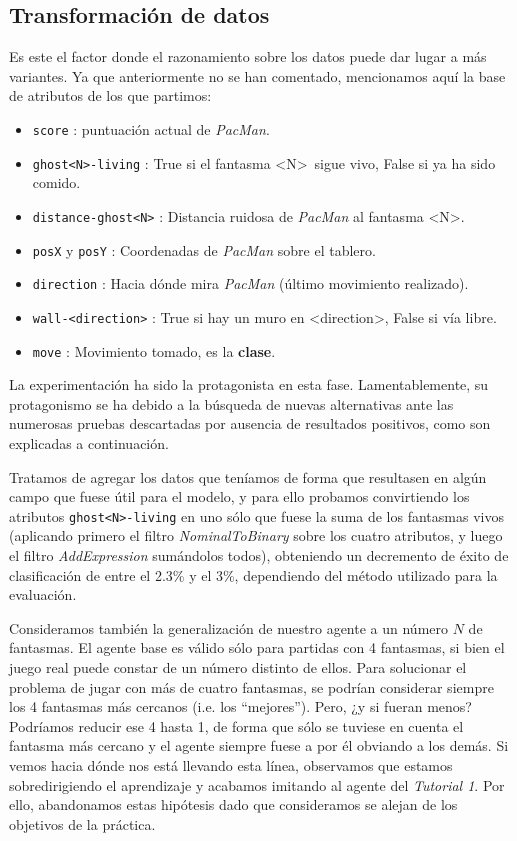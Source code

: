 \documentclass[12pt]{article}
\begin{document}
\subsection{Transformación de datos}

Es este el factor donde el razonamiento sobre los datos puede dar lugar a más variantes. Ya que anteriormente no se han comentado, mencionamos aquí la base de atributos de los que partimos:
\begin{itemize}
    \item \texttt{score} : puntuación actual de \emph{PacMan}.
    \item \texttt{ghost<N>-living} : True si el fantasma \textless N\textgreater\ sigue vivo, False si ya ha sido comido.
    \item \texttt{distance-ghost<N>} : Distancia ruidosa de \emph{PacMan} al fantasma \textless N\textgreater.
    \item \texttt{posX} y \texttt{posY} : Coordenadas de \emph{PacMan} sobre el tablero.
    \item \texttt{direction} : Hacia dónde mira \emph{PacMan} (último movimiento realizado).
    \item \texttt{wall-<direction>} : True si hay un muro en \textless direction\textgreater, False si vía libre.
    \item \texttt{move} : Movimiento tomado, es la \textbf{clase}.
\end{itemize}

La experimentación ha sido la protagonista en esta fase. Lamentablemente, su protagonismo se ha debido a la búsqueda de nuevas alternativas ante las numerosas pruebas descartadas por ausencia de resultados positivos, como son explicadas a continuación.

\vspace{0.2cm}

Tratamos de agregar los datos que teníamos de forma que resultasen en algún campo que fuese útil para el modelo, y para ello probamos convirtiendo los atributos \texttt{ghost<N>-living} en uno sólo que fuese la suma de los fantasmas vivos (aplicando primero el filtro \emph{NominalToBinary} sobre los cuatro atributos, y luego el filtro \emph{AddExpression} sumándolos todos), obteniendo un decremento de éxito de clasificación de entre el 2.3\% y el 3\%, dependiendo del método utilizado para la evaluación.

\vspace{0.2cm}

Consideramos también la generalización de nuestro agente a un número $N$ de fantasmas. El agente base es válido sólo para partidas con 4 fantasmas, si bien el juego real puede constar de un número distinto de ellos. Para solucionar el problema de jugar con más de cuatro fantasmas, se podrían considerar siempre los 4 fantasmas más cercanos (i.e. los ``mejores''). Pero, ¿y si fueran menos? Podríamos reducir ese 4 hasta 1, de forma que sólo se tuviese en cuenta el fantasma más cercano y el agente siempre fuese a por él obviando a los demás. Si vemos hacia dónde nos está llevando esta línea, observamos que estamos sobredirigiendo el aprendizaje y acabamos imitando al agente del \emph{Tutorial 1}. Por ello, abandonamos estas hipótesis dado que consideramos se alejan de los objetivos de la práctica.
\end{document}

